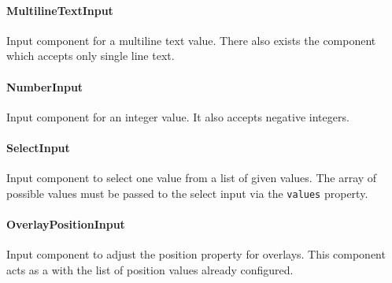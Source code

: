 \paragraph{MultilineTextInput}
\label{sec:component-multiline-text-input}
Input component for a multiline text value. 
There also exists the  component which accepts only single line text.

\paragraph{NumberInput}
\label{sec:component-number-input}
Input component for an integer value. 
It also accepts negative integers.

\paragraph{SelectInput}
\label{sec:component-select-input}
Input component to select one value from a list of given values. 
The array of possible values must be passed to the select input via the \texttt{values} property.

\paragraph{OverlayPositionInput}
\label{sec:component-overlay-position-input}
Input component to adjust the position property for overlays. 
This component acts as a  with the list of position values already configured.
